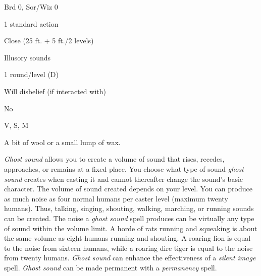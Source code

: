 
\begin{description*}
\item[Level:] Brd 0, Sor/Wiz 0
\item[Casting Time:] 1 standard action
\item[Range:] Close (25 ft. + 5 ft./2 levels)
\item[Effect:] Illusory sounds
\item[Duration:] 1 round/level (D)
\item[Saving Throw:] Will disbelief (if interacted with)
\item[Spell Resistance:] No
\item[Components:] V, S, M
\item[Arcane Material Component:] A bit of wool or a small lump of wax.
\end{description*}

\textit{Ghost sound} allows you to create a volume of sound that rises, recedes,
approaches, or remains at a fixed place. You choose what type of sound \textit{ghost
sound} creates when casting it and cannot thereafter change the sound's basic character.
The volume of sound created depends on your level. You can produce as much noise
as four normal humans per caster level (maximum twenty humans). Thus, talking,
singing, shouting, walking, marching, or running sounds can be created. The noise
a \textit{ghost sound} spell produces can be virtually any type of sound within
the volume limit. A horde of rats running and squeaking is about the same volume
as eight humans running and shouting. A roaring lion is equal to the noise from
sixteen humans, while a roaring dire tiger is equal to the noise from twenty humans.
\textit{Ghost sound} can enhance the effectiveness of a \textit{silent image} spell.
\textit{Ghost sound} can be made permanent with a \textit{permanency} spell.